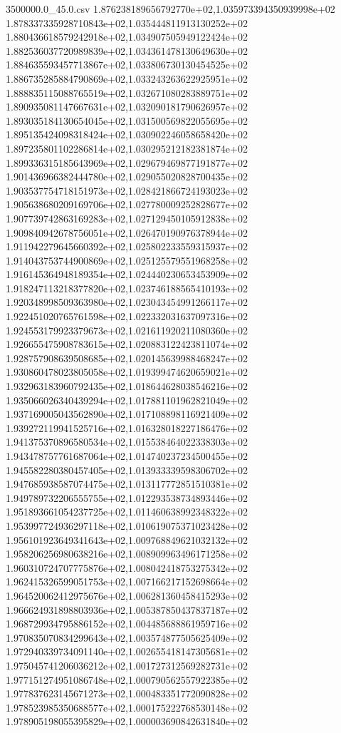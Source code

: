 \begin{filecontents*}{3500000.0_45.0.csv}
1.876238189656792770e+02,1.035973394350939998e+02
1.878337335928710843e+02,1.035444811913130252e+02
1.880436618579242918e+02,1.034907505949122424e+02
1.882536037720989839e+02,1.034361478130649630e+02
1.884635593457713867e+02,1.033806730130454525e+02
1.886735285884790869e+02,1.033243263622925951e+02
1.888835115088765519e+02,1.032671080283889751e+02
1.890935081147667631e+02,1.032090181790626957e+02
1.893035184130654045e+02,1.031500569822055695e+02
1.895135424098318424e+02,1.030902246058658420e+02
1.897235801102286814e+02,1.030295212182381874e+02
1.899336315185643969e+02,1.029679469877191877e+02
1.901436966382444780e+02,1.029055020828700435e+02
1.903537754718151973e+02,1.028421866724193023e+02
1.905638680209169706e+02,1.027780009252828677e+02
1.907739742863169283e+02,1.027129450105912838e+02
1.909840942678756051e+02,1.026470190976378944e+02
1.911942279645660392e+02,1.025802233559315937e+02
1.914043753744900869e+02,1.025125579551968258e+02
1.916145364948189354e+02,1.024440230653453909e+02
1.918247113218377820e+02,1.023746188565410193e+02
1.920348998509363980e+02,1.023043454991266117e+02
1.922451020765761598e+02,1.022332031637097316e+02
1.924553179923379673e+02,1.021611920211080360e+02
1.926655475908783615e+02,1.020883122423811074e+02
1.928757908639508685e+02,1.020145639988468247e+02
1.930860478023805058e+02,1.019399474620659021e+02
1.932963183960792435e+02,1.018644628038546216e+02
1.935066026340439294e+02,1.017881101962821049e+02
1.937169005043562890e+02,1.017108898116921409e+02
1.939272119941525716e+02,1.016328018227186476e+02
1.941375370896580534e+02,1.015538464022338303e+02
1.943478757761687064e+02,1.014740237234500455e+02
1.945582280380457405e+02,1.013933339598306702e+02
1.947685938587074475e+02,1.013117772851510381e+02
1.949789732206555755e+02,1.012293538734893446e+02
1.951893661054237725e+02,1.011460638992348322e+02
1.953997724936297118e+02,1.010619075371023428e+02
1.956101923649341643e+02,1.009768849621032132e+02
1.958206256980638216e+02,1.008909963496171258e+02
1.960310724707775876e+02,1.008042418753275342e+02
1.962415326599051753e+02,1.007166217152698664e+02
1.964520062412975676e+02,1.006281360458415293e+02
1.966624931898803936e+02,1.005387850437837187e+02
1.968729934795886152e+02,1.004485688861959716e+02
1.970835070834299643e+02,1.003574877505625409e+02
1.972940339734091140e+02,1.002655418147305681e+02
1.975045741206036212e+02,1.001727312569282731e+02
1.977151274951086748e+02,1.000790562557922385e+02
1.977837623145671273e+02,1.000483351772090828e+02
1.978523985350688577e+02,1.000175222768530148e+02
1.978905198055395829e+02,1.000003690842631840e+02

\end{filecontents*}

